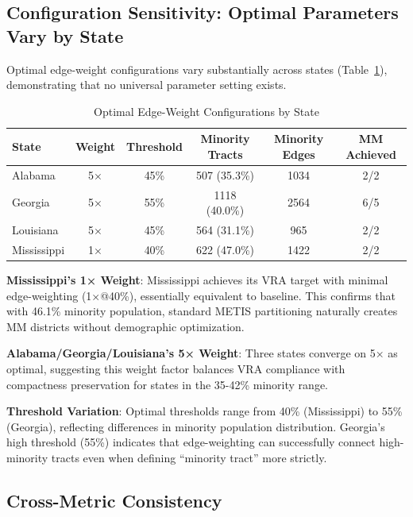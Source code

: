 \subsection{Configuration Sensitivity: Optimal Parameters Vary by State}

Optimal edge-weight configurations vary substantially across states (Table~\ref{tab:optimal-configs}), demonstrating that no universal parameter setting exists.

\begin{table}[htbp]
\centering
\caption{Optimal Edge-Weight Configurations by State}
\label{tab:optimal-configs}
\begin{tabular}{lccccc}
\toprule
\textbf{State} & \textbf{Weight} & \textbf{Threshold} & \textbf{Minority Tracts} & \textbf{Minority Edges} & \textbf{MM Achieved} \\
\midrule
Alabama        & 5× & 45\% & 507 (35.3\%) & 1034 & 2/2 \\
Georgia        & 5× & 55\% & 1118 (40.0\%) & 2564 & 6/5 \\
Louisiana      & 5× & 45\% & 564 (31.1\%) & 965 & 2/2 \\
Mississippi    & 1× & 40\% & 622 (47.0\%) & 1422 & 2/2 \\
\bottomrule
\end{tabular}
\end{table}

\textbf{Mississippi's 1× Weight}: Mississippi achieves its VRA target with minimal edge-weighting (1×@40\%), essentially equivalent to baseline. This confirms that with 46.1\% minority population, standard METIS partitioning naturally creates MM districts without demographic optimization.

\textbf{Alabama/Georgia/Louisiana's 5× Weight}: Three states converge on 5× as optimal, suggesting this weight factor balances VRA compliance with compactness preservation for states in the 35-42\% minority range.

\textbf{Threshold Variation}: Optimal thresholds range from 40\% (Mississippi) to 55\% (Georgia), reflecting differences in minority population distribution. Georgia's high threshold (55\%) indicates that edge-weighting can successfully connect high-minority tracts even when defining ``minority tract'' more strictly.

\subsection{Cross-Metric Consistency}


